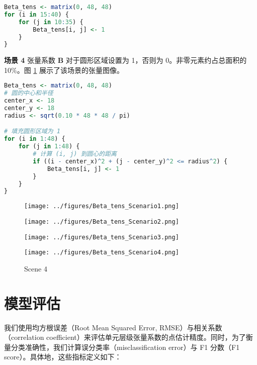 \documentclass[AutoFakeBold]{LZUThesis}
\begin{document}
\begin{lstlisting}[language=R]
Beta_tens <- matrix(0, 48, 48)
for (i in 15:40) {
	for (j in 10:35) {
		Beta_tens[i, j] <- 1
	}
}

\end{lstlisting}
\textbf{场景 4} 张量系数 $\boldsymbol{B}$ 对于圆形区域设置为 1，否则为 0。非零元素约占总面积的 10\%。图 \ref{fig:scene4} 展示了该场景的张量图像。

\begin{lstlisting}[language=R]
Beta_tens <- matrix(0, 48, 48)
# 圆的中心和半径
center_x <- 18
center_y <- 18
radius <- sqrt(0.10 * 48 * 48 / pi)

# 填充圆形区域为 1
for (i in 1:48) {
	for (j in 1:48) {
		# 计算 (i, j) 到圆心的距离
		if ((i - center_x)^2 + (j - center_y)^2 <= radius^2) {
			Beta_tens[i, j] <- 1
		}
	}
}

\end{lstlisting}
\begin{figure}[h!]
	\centering
	\begin{minipage}{0.24\textwidth}
		\centering
		\texttt{[image: ../figures/Beta\_tens\_Scenario1.png]}
		\caption{Scene 1}
		\label{fig:scene1}
	\end{minipage}
	\hfill
	\begin{minipage}{0.24\textwidth}
		\centering
		\texttt{[image: ../figures/Beta\_tens\_Scenario2.png]}
		\caption{Scene 2}
		\label{fig:scene2}
	\end{minipage}
	\hfill
	\begin{minipage}{0.24\textwidth}
		\centering
		\texttt{[image: ../figures/Beta\_tens\_Scenario3.png]}
		\caption{Scene 3}
		\label{fig:scene3}
	\end{minipage}
	\hfill
	\begin{minipage}{0.24\textwidth}
		\centering
		\texttt{[image: ../figures/Beta\_tens\_Scenario4.png]}
		\caption{Scene 4}
		\label{fig:scene4}
	\end{minipage}
\end{figure}

\section{模型评估}
我们使用均方根误差（Root Mean Squared Error, RMSE）与相关系数（correlation coefficient）来评估单元层级张量系数的点估计精度。同时，为了衡量分类准确性，我们计算误分类率（misclassification error）与 F1 分数（F1 score）。具体地，这些指标定义如下：
\end{document}
